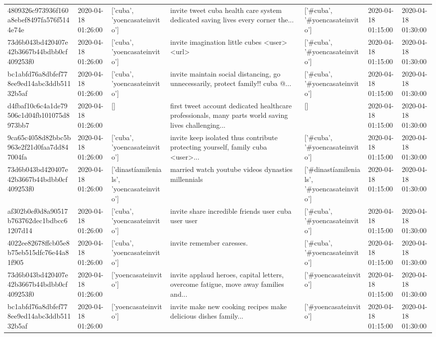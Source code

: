 \begin{tabular}{lllllll}
4809326c973936f160a8ebef8497fa576f5144e74e & 2020-04-18 01:26:00 & ['cuba', 'yoencasateinvito'] & invite tweet cuba health care system dedicated saving lives every corner the... & ['#cuba', '#yoencasateinvito'] & 2020-04-18 01:15:00 & 2020-04-18 01:30:00 \\
73d6b043bd420407e42b3667b44bdbb0cf409253f0 & 2020-04-18 01:26:00 & ['cuba', 'yoencasateinvito'] & invite imagination little cubes <user> <url> & ['#cuba', '#yoencasateinvito'] & 2020-04-18 01:15:00 & 2020-04-18 01:30:00 \\
bc1abfd76a8dbfef778ee9ed14abc3ddb51132b5af & 2020-04-18 01:26:00 & ['cuba', 'yoencasateinvito'] & invite maintain social distancing, go unnecessarily, protect family!!️ cuba @... & ['#cuba', '#yoencasateinvito'] & 2020-04-18 01:15:00 & 2020-04-18 01:30:00 \\
d4fbaf10c6c4a1de79506c1d04fb101075d8973bb7 & 2020-04-18 01:26:00 & [] & first tweet account dedicated healthcare professionals, many parts world saving lives challenging... & [] & 2020-04-18 01:15:00 & 2020-04-18 01:30:00 \\
9ca65c4058d82bbc5b963e2f21d0faa7dd847004fa & 2020-04-18 01:26:00 & ['cuba', 'yoencasateinvito'] & invite keep isolated thus contribute protecting yourself, family cuba <user>... & ['#cuba', '#yoencasateinvito'] & 2020-04-18 01:15:00 & 2020-04-18 01:30:00 \\
73d6b043bd420407e42b3667b44bdbb0cf409253f0 & 2020-04-18 01:26:00 & ['dinastíamilenials', 'yoencasateinvito'] & married watch youtube videos dynasties millennials & ['#dinastíamilenials', '#yoencasateinvito'] & 2020-04-18 01:15:00 & 2020-04-18 01:30:00 \\
af302b0ef0d8a90517b763762dec1bdbcc61207d14 & 2020-04-18 01:26:00 & ['cuba', 'yoencasateinvito'] & invite share incredible friends user cuba user user & ['#cuba', '#yoencasateinvito'] & 2020-04-18 01:15:00 & 2020-04-18 01:30:00 \\
4022ee82678ffcb05e8b75eb515dfc76e44a81f905 & 2020-04-18 01:26:00 & ['cuba', 'yoencasateinvito'] & invite remember caresses. & ['#cuba', '#yoencasateinvito'] & 2020-04-18 01:15:00 & 2020-04-18 01:30:00 \\
73d6b043bd420407e42b3667b44bdbb0cf409253f0 & 2020-04-18 01:26:00 & ['yoencasateinvito'] & invite applaud heroes, capital letters, overcome fatigue, move away families and... & ['#yoencasateinvito'] & 2020-04-18 01:15:00 & 2020-04-18 01:30:00 \\
bc1abfd76a8dbfef778ee9ed14abc3ddb51132b5af & 2020-04-18 01:26:00 & ['yoencasateinvito'] & invite make new cooking recipes make delicious dishes family... & ['#yoencasateinvito'] & 2020-04-18 01:15:00 & 2020-04-18 01:30:00 \\

\end{tabular}
